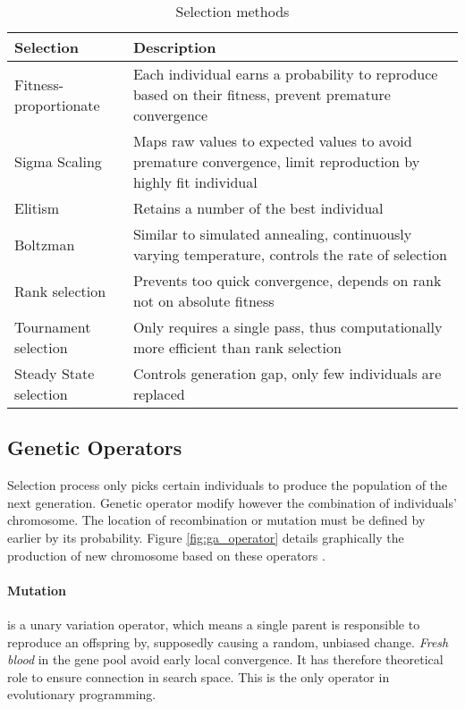 \begin{table}[ht]
\caption{Selection methods}
\label{selection_methods}
\begin{tabularx}{\textwidth}{lX}
\toprule
  Selection & Description \\
\midrule
Fitness-proportionate & Each individual earns a probability to reproduce based on their fitness, prevent premature convergence\\
Sigma Scaling & Maps raw values to expected values to avoid premature convergence, limit reproduction by highly fit individual \\
Elitism & Retains a number of the best individual\\
Boltzman & Similar to simulated annealing, continuously varying temperature, controls the rate of selection\\
Rank selection & Prevents too quick convergence, depends on rank not on absolute fitness\\
Tournament selection & 
Only requires a single pass, thus computationally more efficient than rank selection \\
Steady State selection & Controls generation gap, only few individuals are replaced\\
\bottomrule
\end{tabularx}
\end{table}

\subsection*{Genetic Operators}
Selection process only picks certain individuals to produce the population of the next generation. Genetic operator modify however the combination of individuals' chromosome. The location of recombination or mutation must be defined by earlier by its probability. Figure \ref{fig:ga_operator} details graphically the production of new chromosome based on these operators \cite{mitchell97}.

\paragraph{Mutation} is a unary variation operator, which means a single parent is responsible to reproduce an offspring by, supposedly causing a random, unbiased change. \emph{Fresh blood} in the gene pool avoid early local convergence. It has therefore theoretical role to ensure connection in search space. This is the only operator in evolutionary programming. 

